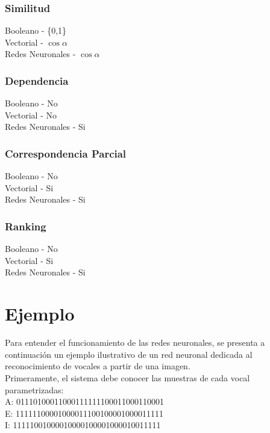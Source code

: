 \documentclass{llncs}
\begin{document}
{\subsubsection{Similitud}
Booleano -  \{0,1\} \\
Vectorial - $\cos{\alpha}$ \\
Redes Neuronales - $\cos{\alpha}$

\subsubsection{Dependencia}
Booleano -  No \\
Vectorial - No \\
Redes Neuronales - Si

\subsubsection{Correspondencia Parcial}
Booleano -  No \\
Vectorial - Si \\
Redes Neuronales - Si

\subsubsection{Ranking}
Booleano -  No \\
Vectorial - Si \\
Redes Neuronales - Si

\section{Ejemplo}

Para entender el funcionamiento de las redes neuronales, se presenta a continuaci\'on un ejemplo ilustrativo de un red neuronal dedicada al
reconocimiento de vocales a partir de una imagen.\\


Primeramente, el sistema debe conocer las muestras de cada vocal parametrizadas:\\

A: 01110100011000111111100011000110001 \\

E: 11111100001000011100100001000011111 \\

I: 11111001000010000100001000010011111 \\

}
\end{document}

